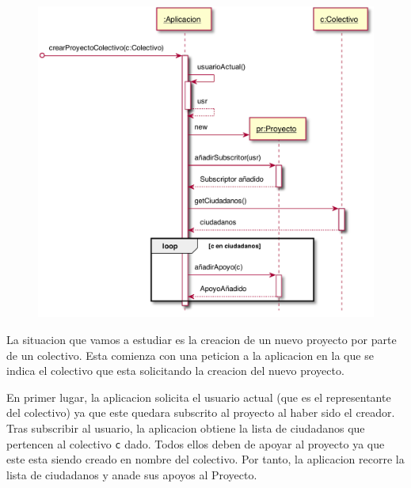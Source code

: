 \documentclass[12pt]{article}
\begin{document}
\begin{figure}[h!]
    \centering
    \includegraphics[scale=0.45]{Images/sequence_proyecto.pdf}
    \vspace{+10pt}
\end{figure}

La situacion que vamos a estudiar es la creacion de un nuevo proyecto por parte de un colectivo. Esta comienza con una peticion a la aplicacion en la que se indica el colectivo que esta solicitando la creacion del nuevo proyecto. 
\par
En primer lugar, la aplicacion solicita el usuario actual (que es el representante del colectivo) ya que este quedara subscrito al proyecto al haber sido el creador. Tras subscribir al usuario, la aplicacion obtiene la lista de ciudadanos que pertencen al colectivo \texttt{c} dado. Todos ellos deben de apoyar al proyecto ya que este esta siendo creado en nombre del colectivo. Por tanto, la aplicacion recorre la lista de ciudadanos y anade sus apoyos al Proyecto.

\newpage
\end{document}

